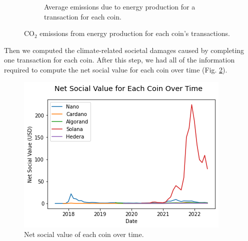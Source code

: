 \documentclass{article}
\begin{document}
\begin{figure}[h!]
\begin{subfigure}[b]{0.45\linewidth}
    \caption{Average emissions due to energy production for a transaction for each coin.}
  \end{subfigure}
  \caption{$\text{CO}_2$ emissions from energy production for each coin's transactions.}
  \label{fig:co2_per_tx}
\end{figure}

Then we computed the climate-related societal damages caused by completing one transaction for each coin. After this step, we had all of the information required to compute the net social value for each coin over time (Fig. \ref{fig:net_social_value}). 

\begin{figure}[h!]
    \centering
    \includegraphics[width=\linewidth]{images/net_social_value_over_time.png}
    \caption{Net social value of each coin over time. }
    \label{fig:net_social_value}
\end{figure}
\end{document}
